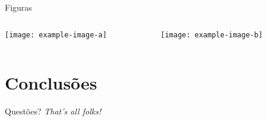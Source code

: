 \documentclass[
	brazilian, %
	12pt, %
]{beamer}
\begin{document}
\begin{frame}{Figuras}
	\begin{columns}
		\begin{column}{0.5\linewidth}
			\texttt{[image: example-image-a]}
		\end{column}
		\begin{column}{0.5\linewidth}
			\texttt{[image: example-image-b]}
		\end{column}
	\end{columns}
\end{frame}

\section{Conclusões}
\begin{frame}{Questões?}
	\centering
	\textit{That's all folks!}
\end{frame}
\end{document}
